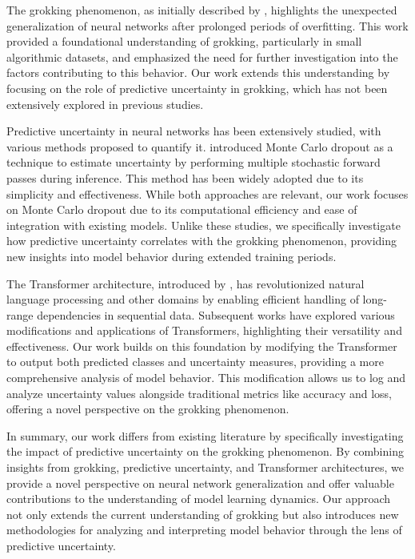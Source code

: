 \documentclass{article} %
\begin{document}
The grokking phenomenon, as initially described by \citet{power2022grokking}, highlights the unexpected generalization of neural networks after prolonged periods of overfitting. This work provided a foundational understanding of grokking, particularly in small algorithmic datasets, and emphasized the need for further investigation into the factors contributing to this behavior. Our work extends this understanding by focusing on the role of predictive uncertainty in grokking, which has not been extensively explored in previous studies.

Predictive uncertainty in neural networks has been extensively studied, with various methods proposed to quantify it. \citet{Gal2015DropoutAA} introduced Monte Carlo dropout as a technique to estimate uncertainty by performing multiple stochastic forward passes during inference. This method has been widely adopted due to its simplicity and effectiveness. While both approaches are relevant, our work focuses on Monte Carlo dropout due to its computational efficiency and ease of integration with existing models. Unlike these studies, we specifically investigate how predictive uncertainty correlates with the grokking phenomenon, providing new insights into model behavior during extended training periods.

The Transformer architecture, introduced by \citet{vaswani2017attention}, has revolutionized natural language processing and other domains by enabling efficient handling of long-range dependencies in sequential data. Subsequent works have explored various modifications and applications of Transformers, highlighting their versatility and effectiveness. Our work builds on this foundation by modifying the Transformer to output both predicted classes and uncertainty measures, providing a more comprehensive analysis of model behavior. This modification allows us to log and analyze uncertainty values alongside traditional metrics like accuracy and loss, offering a novel perspective on the grokking phenomenon.

In summary, our work differs from existing literature by specifically investigating the impact of predictive uncertainty on the grokking phenomenon. By combining insights from grokking, predictive uncertainty, and Transformer architectures, we provide a novel perspective on neural network generalization and offer valuable contributions to the understanding of model learning dynamics. Our approach not only extends the current understanding of grokking but also introduces new methodologies for analyzing and interpreting model behavior through the lens of predictive uncertainty.
\end{document}
